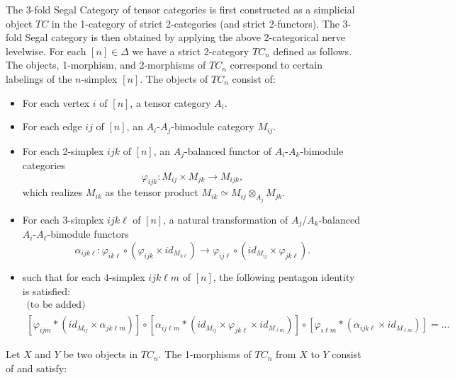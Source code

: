 \documentclass{amsart}
\begin{document}
The 3-fold Segal Category of tensor categories is first constructed as a simplicial object $TC$ in the 1-category of strict 2-categories (and strict 2-functors). The 3-fold Segal category is then obtained by applying the above 2-categorical nerve levelwise. For each $[n] \in \Delta$ we have a strict 2-category $TC_n$ defined as follows. The objects, 1-morphism, and 2-morphisms of $TC_n$ correspond to certain labelings of the $n$-simplex $[n]$. The objects of $TC_n$ consist of:
\begin{itemize}
	\item For each vertex $i$ of $[n]$, a tensor category $A_i$. 
	\item For each edge $ij$ of $[n]$, an $A_i$-$A_j$-bimodule category $M_{ij}$.
	\item For each 2-simplex $ijk$ of $[n]$, an $A_j$-balanced functor of $A_i$-$A_k$-bimodule categories 
	\begin{equation*}
		\varphi_{ijk}: M_{ij} \times M_{jk} \to M_{ijk},
	\end{equation*}
	 which realizes $M_{ik}$ as the tensor product $M_{ik} \simeq M_{ij} \otimes_{A_j} M_{jk}$. 
	\item For each 3-simplex $ijk\ell$ of $[n]$, a natural transformation of $A_j$/$A_k$-balanced $A_i$-$A_\ell$-bimodule functors 
	\begin{equation*}
		\alpha_{ijk \ell}: \varphi_{i k \ell} \circ (\varphi_{ijk} \times id_{M_{k\ell}}) \to \varphi_{ij \ell} \circ (id_{M_{ij}} \times \varphi_{jk\ell}).
	\end{equation*}
	\item such that for each $4$-simplex $ijk\ell m$ of $[n]$, the following pentagon identity is satisfied:
	\begin{align*}
		\text{(to be added)}  \\ [\varphi_{ijm} * (id_{M_{ij}} \times \alpha_{jk\ell m})] \circ [\alpha_{ij\ell m} * (id_{M_{ij}} \times \varphi_{jk\ell} \times id_{M_{\ell m}})] \circ [\varphi_{i \ell m} * ( \alpha_{ijk \ell} \times id_{M_{\ell m}})] = ...
	\end{align*} 
\end{itemize}
Let $X$ and $Y$ be two objects in $TC_n$. The 1-morphisms of $TC_n$ from $X$ to $Y$ consist of and satisfy:
\end{document}
